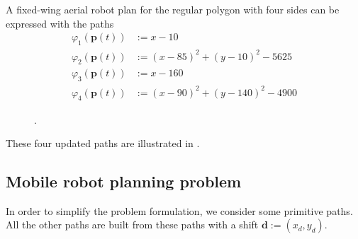 A fixed-wing aerial robot plan for the regular polygon with four sides can be expressed with the paths
\begin{subequations}\label{eq:basic-plan-trigs-gene}\begin{align}
\varphi_1(\mathbf{p}(t))&:=x-10\\
\varphi_2(\mathbf{p}(t))&:=(x-85)^2+(y-10)^2-5625\\
\varphi_3(\mathbf{p}(t))&:=x-160\\
\varphi_4(\mathbf{p}(t))&:=(x-90)^2+(y-140)^2-4900\end{align}
\end{subequations}

\begin{figure}[p!]
  \centering
  
  \caption[.]{.}
  \label{fig:plot4}
\end{figure}

These four updated paths are illustrated in . 


%  



\subsection{Mobile robot planning problem}
\label{sec:plan-pb}

In order to simplify the problem formulation, we consider some primitive paths. All the other paths are built from these paths with a shift $\mathbf{d}:=(x_d,y_d)$.

